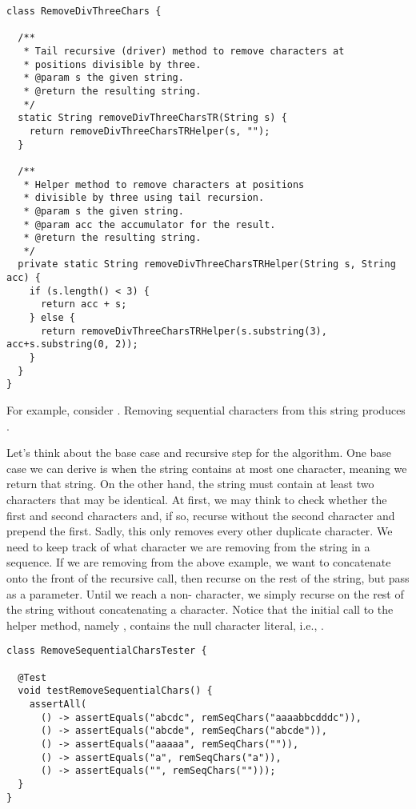 \begin{lstlisting}[language=MyJava]
class RemoveDivThreeChars {

  /**
   * Tail recursive (driver) method to remove characters at 
   * positions divisible by three.
   * @param s the given string.
   * @return the resulting string.
   */
  static String removeDivThreeCharsTR(String s) {
    return removeDivThreeCharsTRHelper(s, "");
  }

  /**
   * Helper method to remove characters at positions 
   * divisible by three using tail recursion.
   * @param s the given string.
   * @param acc the accumulator for the result.
   * @return the resulting string.
   */
  private static String removeDivThreeCharsTRHelper(String s, String acc) {
    if (s.length() < 3) {
      return acc + s;
    } else {
      return removeDivThreeCharsTRHelper(s.substring(3), acc+s.substring(0, 2));
    }
  }
}
\end{lstlisting}

For example, consider .
Removing sequential characters from this string produces .

Let's think about the base case and recursive step for the algorithm.
One base case we can derive is when the string contains at most one character, meaning we return that string.
On the other hand, the string must contain at least two characters that may be identical. 
At first, we may think to check whether the first and second characters and, if so, recurse without the second character and prepend the first. 
Sadly, this only removes every other duplicate character.
We need to keep track of what character we are removing from the string in a sequence.
If we are removing  from the above example, we want to concatenate  onto the front of the recursive call, then recurse on the rest of the string, but pass  as a parameter.
Until we reach a non- character, we simply recurse on the rest of the string without concatenating a character.
Notice that the initial call to the helper method, namely , contains the null character literal, i.e., \ttt{\q{}\textbackslash{}0\q{}}. 

\enlargethispage{3\baselineskip}
\begin{lstlisting}[language=MyJava]
class RemoveSequentialCharsTester {

  @Test
  void testRemoveSequentialChars() {
    assertAll(
      () -> assertEquals("abcdc", remSeqChars("aaaabbcdddc")),
      () -> assertEquals("abcde", remSeqChars("abcde")),
      () -> assertEquals("aaaaa", remSeqChars("")),
      () -> assertEquals("a", remSeqChars("a")),
      () -> assertEquals("", remSeqChars("")));
  }
}
\end{lstlisting}

